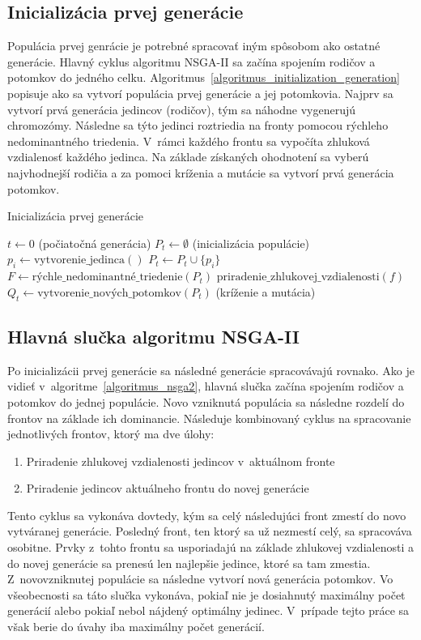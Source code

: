 \subsection*{Inicializácia prvej generácie}
Populácia prvej genrácie je potrebné spracovať iným spôsobom ako ostatné generácie.
Hlavný cyklus algoritmu NSGA-II sa začína spojením rodičov a potomkov do jedného celku.
Algoritmus~\ref{algoritmus_initialization_generation} popisuje ako sa vytvorí populácia prvej generácie a jej potomkovia.
Najprv sa vytvorí prvá generácia jedincov (rodičov), tým sa náhodne vygenerujú chromozómy.
Následne sa týto jedinci roztriedia na fronty pomocou rýchleho nedominantného triedenia.
V~rámci každého frontu sa vypočíta zhluková vzdialenosť každého jedinca.
Na základe získaných ohodnotení sa vyberú najvhodnejší rodičia a za pomoci kríženia a mutácie sa vytvorí prvá generácia potomkov.

\begin{algorithm}[h]\label{algoritmus_initialization_generation}
\caption{Inicializácia prvej generácie}
  $t \gets 0$ (počiatočná generácia)\;
  $P_t \gets \emptyset$ (inicializácia populácie)\;
   {
    $p_i \gets \text{vytvorenie\_jedinca}()$\;
    $P_t \gets P_t \cup \{p_i\}$\;
  }
  $F \gets \text{rýchle\_nedominantné\_triedenie}(P_t)$\;
   {
    $\text{priradenie\_zhlukovej\_vzdialenosti}(f)$\;
  }
  $Q_t \gets \text{vytvorenie\_nových\_potomkov}(P_t)$ (kríženie a mutácia)\;
\end{algorithm}

\subsection*{Hlavná slučka algoritmu NSGA-II}
Po inicializácii prvej generácie sa následné generácie spracovávajú rovnako.
Ako je vidieť v~algoritme~\ref{algoritmus_nsga2}, hlavná slučka začína spojením rodičov a potomkov do jednej populácie.
Novo vzniknutá populácia sa následne rozdelí do frontov na základe ich dominancie.
Následuje kombinovaný cyklus na spracovanie jednotlivých frontov, ktorý ma dve úlohy:
\begin{enumerate}
  \item Priradenie zhlukovej vzdialenosti jedincov v~aktuálnom fronte
  \item Priradenie jedincov aktuálneho frontu do novej generácie
\end{enumerate}
Tento cyklus sa vykonáva dovtedy, kým sa celý následujúci front zmestí do novo vytváranej generácie.
Posledný front, ten ktorý sa už nezmestí celý, sa spracováva osobitne.
Prvky z~tohto frontu sa usporiadajú na základe zhlukovej vzdialenosti a do novej generácie sa prenesú len najlepšie jedince, ktoré sa tam zmestia.
Z~novovzniknutej populácie sa následne vytvorí nová generácia potomkov.
Vo všeobecnosti sa táto slučka vykonáva, pokiaľ nie je dosiahnutý maximálny počet generácií alebo pokiaľ nebol nájdený optimálny jedinec.
V~prípade tejto práce sa však berie do úvahy iba maximálny počet generácií.

